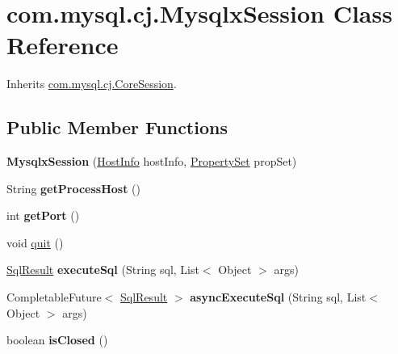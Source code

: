 \hypertarget{classcom_1_1mysql_1_1cj_1_1_mysqlx_session}{}\section{com.\+mysql.\+cj.\+Mysqlx\+Session Class Reference}
\label{classcom_1_1mysql_1_1cj_1_1_mysqlx_session}


Inherits \mbox{\hyperlink{classcom_1_1mysql_1_1cj_1_1_core_session}{com.\+mysql.\+cj.\+Core\+Session}}.

\subsection*{Public Member Functions}
\begin{DoxyCompactItemize}
\item 
\mbox{\label{classcom_1_1mysql_1_1cj_1_1_mysqlx_session_a1a2c1972d8de7a5e18da310e81ba0547}} 
{\bfseries Mysqlx\+Session} (\mbox{\hyperlink{classcom_1_1mysql_1_1cj_1_1conf_1_1_host_info}{Host\+Info}} host\+Info, \mbox{\hyperlink{interfacecom_1_1mysql_1_1cj_1_1conf_1_1_property_set}{Property\+Set}} prop\+Set)
\item 
\mbox{\label{classcom_1_1mysql_1_1cj_1_1_mysqlx_session_aacede9795b96289068a7fe193700cb2c}} 
String {\bfseries get\+Process\+Host} ()
\item 
\mbox{\label{classcom_1_1mysql_1_1cj_1_1_mysqlx_session_a8d8bbd10169ac9d49040a093ec723c35}} 
int {\bfseries get\+Port} ()
\item 
void \mbox{\hyperlink{classcom_1_1mysql_1_1cj_1_1_mysqlx_session_a20bd0339551fe3c5bb9b5806e2036ed3}{quit}} ()
\item 
\mbox{\label{classcom_1_1mysql_1_1cj_1_1_mysqlx_session_a736c9d536b35c8ffce3da389060de4d6}} 
\mbox{\hyperlink{interfacecom_1_1mysql_1_1cj_1_1xdevapi_1_1_sql_result}{Sql\+Result}} {\bfseries execute\+Sql} (String sql, List$<$ Object $>$ args)
\item 
\mbox{\label{classcom_1_1mysql_1_1cj_1_1_mysqlx_session_a309528046194a468f181727415fddb51}} 
Completable\+Future$<$ \mbox{\hyperlink{interfacecom_1_1mysql_1_1cj_1_1xdevapi_1_1_sql_result}{Sql\+Result}} $>$ {\bfseries async\+Execute\+Sql} (String sql, List$<$ Object $>$ args)
\item 
\mbox{\label{classcom_1_1mysql_1_1cj_1_1_mysqlx_session_a1507b9d1e31b712971270eb58a291f3b}} 
boolean {\bfseries is\+Closed} ()
\end{DoxyCompactItemize}
